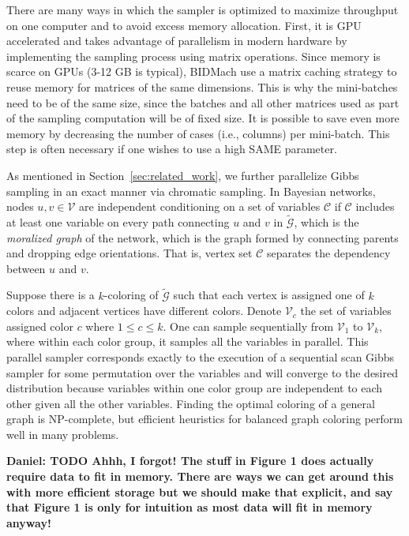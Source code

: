 \documentclass{article} %
\begin{document}
There are many ways in which the sampler is optimized to maximize throughput on one computer and to
avoid excess memory allocation. First, it is GPU accelerated and takes advantage of parallelism in
modern hardware by implementing the sampling process using matrix operations. Since memory is scarce
on GPUs (3-12 GB is typical), BIDMach use a matrix caching strategy to reuse memory for matrices of
the same dimensions. This is why the mini-batches need to be of the same size, since the batches and
all other matrices used as part of the sampling computation will be of fixed size. It is possible to
save even more memory by decreasing the number of cases (i.e., columns) per mini-batch. This step is
often necessary if one wishes to use a high SAME parameter.

As mentioned in Section~\ref{sec:related_work}, we further parallelize Gibbs sampling in an
exact manner via chromatic sampling. In Bayesian networks, nodes $u, v \in \mathcal{V}$ are
independent conditioning on a set of variables $\mathcal{C}$ if $\mathcal{C}$ includes at least one
variable on every path connecting $u$ and $v$ in $\tilde{\mathcal{G}}$, which is the \emph{moralized
graph} of the network, which is the graph formed by connecting parents and dropping edge
orientations. That is, vertex set $\mathcal{C}$ separates the dependency between $u$ and $v$.

Suppose there is a $k$-coloring of $\tilde{\mathcal{G}}$ such that each vertex is assigned one of $k$
colors and adjacent vertices have different colors. Denote $\mathcal{V}_c$ the set of variables
assigned color $c$ where $1 \leq c \leq k$. One can sample sequentially from $\mathcal{V}_1$ to
$\mathcal{V}_k$, where within each color group, it samples all the variables in parallel. This
parallel sampler corresponds exactly to the execution of a sequential scan Gibbs sampler for some
permutation over the variables and will converge to the desired distribution because variables
within one color group are independent to each other given all the other variables. Finding the
optimal coloring of a general graph is NP-complete, but efficient heuristics for balanced graph
coloring perform well in many problems.

\textbf{Daniel: TODO Ahhh, I forgot! The stuff in Figure 1 does actually require data to fit in
memory. There are ways we can get around this with more efficient storage but we should make that
explicit, and say that Figure 1 is only for intuition as most data will fit in memory anyway!}
\end{document}
